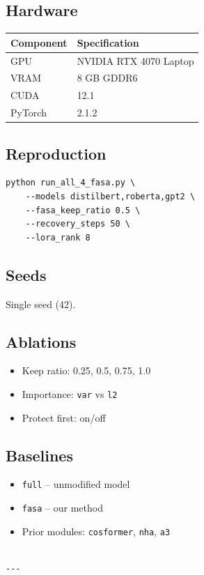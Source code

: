 \subsection{Hardware}

\begin{table}[H]
\centering
\small
\begin{tabular}{ll}
\toprule
\textbf{Component} & \textbf{Specification} \\
\midrule
GPU & NVIDIA RTX 4070 Laptop \\
VRAM & 8 GB GDDR6 \\
CUDA & 12.1 \\
PyTorch & 2.1.2 \\
\bottomrule
\end{tabular}
\end{table}

\subsection{Reproduction}

\begin{lstlisting}
python run_all_4_fasa.py \
    --models distilbert,roberta,gpt2 \
    --fasa_keep_ratio 0.5 \
    --recovery_steps 50 \
    --lora_rank 8
\end{lstlisting}

\subsection{Seeds}

Single seed (42).

\subsection{Ablations}

\begin{itemize}
\item Keep ratio: 0.25, 0.5, 0.75, 1.0
\item Importance: \texttt{var} vs \texttt{l2}
\item Protect first: on/off

\end{itemize}
\subsection{Baselines}

\begin{itemize}
\item \texttt{full} -- unmodified model
\item \texttt{fasa} -- our method
\item Prior modules: \texttt{cosformer}, \texttt{nha}, \texttt{a3}
\end{itemize}
\begin{lstlisting}

---
\end{lstlisting}